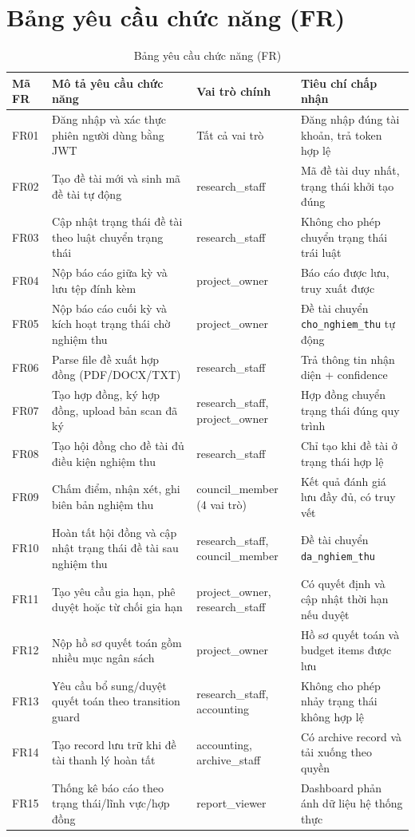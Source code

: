 \documentclass[12pt,a4paper]{report}
\begin{document}
\section{Bảng yêu cầu chức năng (FR)}
\begin{table}[H]
\centering
\small
\begin{tabular}{|C{1.2cm}|L{4.9cm}|L{2.8cm}|L{4.2cm}|}
\hline
\textbf{Mã FR} & \textbf{Mô tả yêu cầu chức năng} & \textbf{Vai trò chính} & \textbf{Tiêu chí chấp nhận} \\ \hline
FR01 & Đăng nhập và xác thực phiên người dùng bằng JWT & Tất cả vai trò & Đăng nhập đúng tài khoản, trả token hợp lệ \\ \hline
FR02 & Tạo đề tài mới và sinh mã đề tài tự động & research\_staff & Mã đề tài duy nhất, trạng thái khởi tạo đúng \\ \hline
FR03 & Cập nhật trạng thái đề tài theo luật chuyển trạng thái & research\_staff & Không cho phép chuyển trạng thái trái luật \\ \hline
FR04 & Nộp báo cáo giữa kỳ và lưu tệp đính kèm & project\_owner & Báo cáo được lưu, truy xuất được \\ \hline
FR05 & Nộp báo cáo cuối kỳ và kích hoạt trạng thái chờ nghiệm thu & project\_owner & Đề tài chuyển \texttt{cho\_nghiem\_thu} tự động \\ \hline
FR06 & Parse file đề xuất hợp đồng (PDF/DOCX/TXT) & research\_staff & Trả thông tin nhận diện + confidence \\ \hline
FR07 & Tạo hợp đồng, ký hợp đồng, upload bản scan đã ký & research\_staff, project\_owner & Hợp đồng chuyển trạng thái đúng quy trình \\ \hline
FR08 & Tạo hội đồng cho đề tài đủ điều kiện nghiệm thu & research\_staff & Chỉ tạo khi đề tài ở trạng thái hợp lệ \\ \hline
FR09 & Chấm điểm, nhận xét, ghi biên bản nghiệm thu & council\_member (4 vai trò) & Kết quả đánh giá lưu đầy đủ, có truy vết \\ \hline
FR10 & Hoàn tất hội đồng và cập nhật trạng thái đề tài sau nghiệm thu & research\_staff, council\_member & Đề tài chuyển \texttt{da\_nghiem\_thu} \\ \hline
FR11 & Tạo yêu cầu gia hạn, phê duyệt hoặc từ chối gia hạn & project\_owner, research\_staff & Có quyết định và cập nhật thời hạn nếu duyệt \\ \hline
FR12 & Nộp hồ sơ quyết toán gồm nhiều mục ngân sách & project\_owner & Hồ sơ quyết toán và budget items được lưu \\ \hline
FR13 & Yêu cầu bổ sung/duyệt quyết toán theo transition guard & research\_staff, accounting & Không cho phép nhảy trạng thái không hợp lệ \\ \hline
FR14 & Tạo record lưu trữ khi đề tài thanh lý hoàn tất & accounting, archive\_staff & Có archive record và tải xuống theo quyền \\ \hline
FR15 & Thống kê báo cáo theo trạng thái/lĩnh vực/hợp đồng & report\_viewer & Dashboard phản ánh dữ liệu hệ thống thực \\ \hline
\end{tabular}
\caption{Bảng yêu cầu chức năng (FR)}
\end{table}
\end{document}

